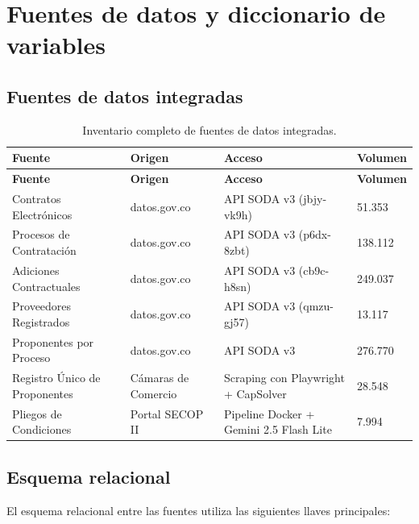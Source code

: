\documentclass[12pt,letterpaper,oneside]{report}
\begin{document}
\appendix
\renewcommand{\chaptername}{Anexo}

\chapter{Fuentes de datos y diccionario de variables}
\label{anexo:fuentes}

\section{Fuentes de datos integradas}

\begin{longtable}{p{3cm}p{2.5cm}p{6cm}p{2cm}}
\caption{Inventario completo de fuentes de datos integradas.}\\
\toprule
\textbf{Fuente} & \textbf{Origen} & \textbf{Acceso} & \textbf{Volumen} \\
\midrule
\endfirsthead
\toprule
\textbf{Fuente} & \textbf{Origen} & \textbf{Acceso} & \textbf{Volumen} \\
\midrule
\endhead
Contratos Electrónicos & datos.gov.co & API SODA v3 (jbjy-vk9h) & 51.353 \\
Procesos de Contratación & datos.gov.co & API SODA v3 (p6dx-8zbt) & 138.112 \\
Adiciones Contractuales & datos.gov.co & API SODA v3 (cb9c-h8sn) & 249.037 \\
Proveedores Registrados & datos.gov.co & API SODA v3 (qmzu-gj57) & 13.117 \\
Proponentes por Proceso & datos.gov.co & API SODA v3 & 276.770 \\
Registro Único de Proponentes & Cámaras de Comercio & Scraping con Playwright + CapSolver & 28.548 \\
Pliegos de Condiciones & Portal SECOP II & Pipeline Docker + Gemini 2.5 Flash Lite & 7.994 \\
\bottomrule
\end{longtable}

\section{Esquema relacional}

El esquema relacional entre las fuentes utiliza las siguientes llaves
principales:
\end{document}
